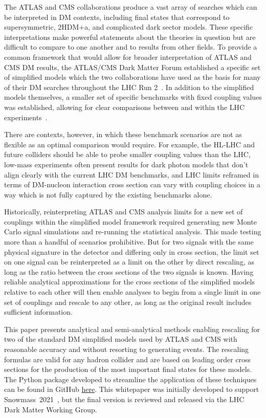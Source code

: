 \documentclass[a4paper, 11pt]{article}
\begin{document}
The ATLAS and CMS collaborations produce a vast array of searches which can be interpreted in DM contexts, including final states that correspond to supersymmetric, 2HDM+a, and complicated dark sector models. These specific interpretations make powerful statements about the theories in question but are difficult to compare to one another and to results from other fields. To provide a common framework that would allow for broader interpretation of ATLAS and CMS DM results, the ATLAS/CMS Dark Matter Forum established a specific set of simplified models which the two collaborations have used as the basis for many of their DM searches throughout the LHC Run 2~\cite{ABERCROMBIE2020100371}. In addition to the simplified models themselves, a smaller set of specific benchmarks with fixed coupling values was established, allowing for clear comparisons between and within the LHC experiments~\cite{BOVEIA2020100365,ALBERT2019100377,ATL-PHYS-PUB-2020-021,CMSSummary}.

There are contexts, however, in which these benchmark scenarios are not as flexible as an optimal comparison would require. For example, the HL-LHC and future colliders should be able to probe smaller coupling values than the LHC, low-mass experiments often present results for dark photon models that don't align clearly with the current LHC DM benchmarks, and LHC limits reframed in terms of DM-nucleon interaction cross section can vary with coupling choices in a way which is not fully captured by the existing benchmarks alone.

Historically, reinterpreting ATLAS and CMS analysis limits for a new set of couplings within the simplified model framework required generating new Monte Carlo signal simulations and re-running the statistical analysis. This made testing more than a handful of scenarios prohibitive. But for two signals with the same physical signature in the detector and differing only in cross section, the limit set on one signal can be reinterpreted as a limit on the other by direct rescaling, as long as the ratio between the cross sections of the two signals is known. Having reliable analytical approximations for the cross sections of the simplified models relative to each other will then enable analyses to begin from a single limit in one set of couplings and rescale to any other, as long as the original result includes sufficient information. 

This paper presents analytical and semi-analytical methods enabling rescaling for two of the standard DM simplified models used by ATLAS and CMS with reasonable accuracy and without resorting to generating events. The rescaling formulas are valid for any hadron collider and are based on leading order cross sections for the production of the most important final states for these models. The Python package developed to streamline the application of these techniques can be found in GitHub \href{https://github.com/LHC-DMWG/DMWG-couplingScan-code}{here}. This whitepaper was initially developed to support Snowmass~2021~\cite{snowmass21}, but the final version is reviewed and released via the LHC Dark Matter Working Group. 
\end{document}
